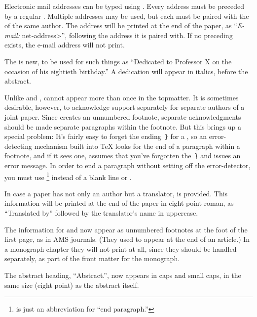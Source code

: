 Electronic mail addresses can be typed using .
Every  address must be preceded by a regular .
Multiple  addresses may be used, but each
 must be paired with the  of the
same author.  The  address will be printed at the end of
the paper, as ``{\it E-mail:\/} \<net-address>'', following the address
it is paired with.  If no preceding  exists, the e-mail
address will not print.

The  is new, to be used for such things as
``Dedicated to Professor X on the occasion of his eightieth birthday.''
A dedication will appear in italics, before the abstract.

Unlike  and ,  cannot appear more
than once in the topmatter.  It is sometimes desirable, however, to
acknowledge support separately for separate authors of a joint paper. 
Since  creates an unnumbered footnote, separate
acknowledgments should be made separate paragraphs within the footnote.
But this brings up a special problem: It's fairly easy to forget the
ending~{\tt\}} for a , so an error-detecting mechanism
built into \TeX{} looks for the end of a paragraph within a footnote, and
if it sees one, assumes that you've forgotten the~{\tt\}} and issues an
error message.  In order to end a paragraph without setting off the
error-detector, you must use
\footnote{ is just an abbreviation for ``end
paragraph.''}
instead of a blank line or .

In case a paper has not only an author but a translator, 
is provided.  This information will be printed at the end of the paper in
eight-point roman, as ``Translated by'' followed by the translator's name
in uppercase.

The information for  and  now appear as
unnumbered footnotes at the foot of the first page, as in AMS journals.
(They used to appear at the end of an article.)  In a monograph chapter
they will not print at all, since they should be handled separately, as
part of the front matter for the monograph.

The abstract heading, ``{\eightpoint\smc Abstract.}'', now appears in caps
and small caps, in the same size (eight point) as the abstract itself.

